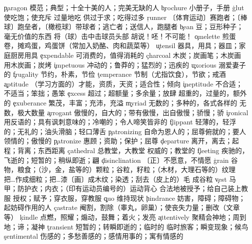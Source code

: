 \begin{multicols}{2}
\c{paragon}  \n 模范；典型；十全十美的人；完美无缺的人
\c{brochure}  \n 小册子，手册
\c{glut}  \vt 使吃饱；使充斥 \vi 过量地吃 \n 供过于求；吃得过多
\c{runner}  \n 〔体育运动〕赛跑者；〔棒球〕跑垒者，〔橄榄球〕带球者；逃亡者；送信人，跑腿者
\c{bean}  \n 豆；豆形种子；毫无价值的东西 \vt 将（球）击中击球员头部 \int 胡说！呸！不可能！
\c{omelette}  \n 煎蛋卷，摊鸡蛋，鸡蛋饼（常加入奶酪、肉和蔬菜等）
\c{utensil}  \n 器具，用具；器皿；家庭厨房用具
\c{expendable}  \a 可消费的，值得消耗的
\c{charcoal}  \n 木炭；炭画笔；木炭画 \vt 用木炭画；炭烤
\c{impetuous}  \a 冲动的；鲁莽的；猛烈的；迅疾的
\c{uxorious}  \a 溺爱妻子的
\c{frugality}  \n 节约，朴素，节俭
\c{temperance}  \n 节制（尤指饮食），节欲；戒酒
\c{aptitude}  \n （学习方面的）才能，资质，天资；适合性；倾向
\c{ineptitude}  \n 不合适；不适当；笨拙；愚笨
\c{excess}  \n 超过；超额量；多余量；放肆 \a 超重的，过量的，额外的
\c{exuberance}  \n 繁茂，丰富；充沛，充溢
\c{myriad}  \a 无数的；多种的，各式各样的 \n 无数，极大数量
\c{arrogant}  \a 傲慢的，自大的；带有傲慢，出自傲慢；骄慢；骄
\c{ironical}  \a 用反语的；具有讽刺意味的；冷嘲的；令人啼笑皆非的
\c{flippant}  \a 轻薄的，轻浮的；无礼的；油头滑脑；轻口薄舌
\c{patronizing}  \a 自命为恩人的；屈尊俯就的；要人领情的；傲慢的
\c{patronize}  \vt 惠顾；资助；保护；屈尊
\c{departure}  \n 离开，离去；起程；背离；东西距离
\c{cathedral}  \n 总教堂，大教堂 \a 权威的；教堂的
\c{fleeting}  \a 疾驰的，飞逝的；短暂的；稍纵即逝；翩
\c{disinclination}  \n 〔正〕不愿意，不情愿
\c{grain}  \n 谷物，粮食；（沙，金，盐等的）颗粒；谷粒，籽粒；（木材，大理石等的）纹理 \vt 把…作成细粒；把…漆〔画〕成木纹；染透；刮去（皮上的）毛 \vi 成谷粒
\c{vest}  \n 马甲；防护衣；内衣；（印有运动员编号的）运动背心 \vi 合法地被授予；给自己装上教服 \vt 授权；赋予；穿衣服，穿教服
\c{quo}  \n 维持现状
\c{hindrance}  \n 妨害，障碍；障碍物；起妨碍作用的人
\c{castrate}  \vt 阉割，割除（睾丸，卵巢）；使丧失力量；删改（文章等）
\c{kindle}  \v 点燃，照耀；煽动，鼓舞；着火；发亮
\c{attentively}  \ad 聚精会神地；周到地；谛；凝神
\c{transient}  \a 短暂的；转瞬即逝的；临时的 \n 临时旅客；瞬变现象；候鸟
\c{sentimental}  \a 伤感的；多愁善感的；感情用事的；寓有情感的

\end{multicols}

